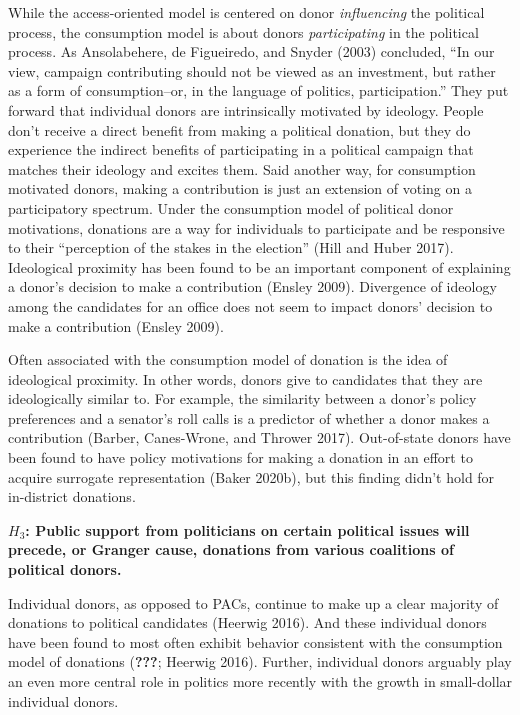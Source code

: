 \documentclass[12pt,]{article}
\begin{document}
While the access-oriented model is centered on donor \emph{influencing}
the political process, the consumption model is about donors
\emph{participating} in the political process. As Ansolabehere, de
Figueiredo, and Snyder (2003) concluded, ``In our view, campaign
contributing should not be viewed as an investment, but rather as a form
of consumption--or, in the language of politics, participation.'' They
put forward that individual donors are intrinsically motivated by
ideology. People don't receive a direct benefit from making a political
donation, but they do experience the indirect benefits of participating
in a political campaign that matches their ideology and excites them.
Said another way, for consumption motivated donors, making a
contribution is just an extension of voting on a participatory spectrum.
Under the consumption model of political donor motivations, donations
are a way for individuals to participate and be responsive to their
``perception of the stakes in the election'' (Hill and Huber 2017).
Ideological proximity has been found to be an important component of
explaining a donor's decision to make a contribution (Ensley 2009).
Divergence of ideology among the candidates for an office does not seem
to impact donors' decision to make a contribution (Ensley 2009).

Often associated with the consumption model of donation is the idea of
ideological proximity. In other words, donors give to candidates that
they are ideologically similar to. For example, the similarity between a
donor's policy preferences and a senator's roll calls is a predictor of
whether a donor makes a contribution (Barber, Canes-Wrone, and Thrower
2017). Out-of-state donors have been found to have policy motivations
for making a donation in an effort to acquire surrogate representation
(Baker 2020b), but this finding didn't hold for in-district donations.

\textbf{\(H_{3}\): Public support from politicians on certain political
issues will precede, or Granger cause, donations from various coalitions
of political donors.}

Individual donors, as opposed to PACs, continue to make up a clear
majority of donations to political candidates (Heerwig 2016). And these
individual donors have been found to most often exhibit behavior
consistent with the consumption model of donations ({\textbf{???}};
Heerwig 2016). Further, individual donors arguably play an even more
central role in politics more recently with the growth in small-dollar
individual donors.
\end{document}
